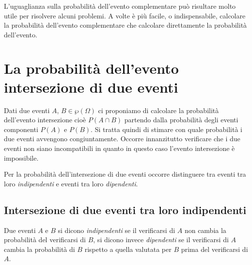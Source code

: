 \osservazione L'uguaglianza sulla probabilità dell'evento complementare può risultare molto utile per risolvere alcuni problemi. A volte è più facile, o indispensabile, calcolare la probabilità dell'evento complementare che calcolare direttamente la probabilità dell'evento.

\vspazio\ovalbox{\risolvii \ref{ese:9.39}, \ref{ese:9.40}, \ref{ese:9.41}, \ref{ese:9.42}, \ref{ese:9.43}, \ref{ese:9.44}, \ref{ese:9.45}, \ref{ese:9.46}}

\section{La probabilità dell'evento intersezione di due eventi}

Dati due eventi $A$, $B\in \wp(\Omega)$ ci proponiamo di calcolare la probabilità dell'evento intersezione cioè $P(A\cap B)$ partendo dalla probabilità degli eventi componenti $P(A)$ e $P(B)$. Si tratta quindi di stimare con quale probabilità i due eventi avvengono congiuntamente. Occorre innanzitutto verificare che i due eventi non siano incompatibili in quanto in questo caso l'evento intersezione è impossibile.

Per la probabilità dell'intersezione di due eventi occorre distinguere tra eventi tra loro \emph{indipendenti} e eventi tra loro \emph{dipendenti}.

\subsection{Intersezione di due eventi tra loro indipendenti}

\begin{definizione}
Due eventi $A$ e $B$ si dicono \emph{indipendenti} se il verificarsi di $A$ non cambia la probabilità del verificarsi di $B$, si dicono invece \emph{dipendenti} se il verificarsi di $A$ cambia la probabilità di $B$ rispetto a quella valutata per $B$ prima del verificarsi di $A$.
\end{definizione}


